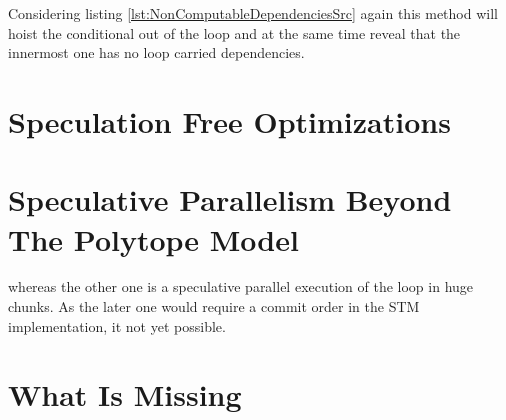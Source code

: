 Considering listing \ref{lst:NonComputableDependenciesSrc} again this method 
will hoist the conditional out of the loop and at the same time reveal that
the innermost one has no loop carried dependencies. 

\section{Speculation Free Optimizations}
\label{SpeculationFreesSCoPs}

\section{Speculative Parallelism Beyond The Polytope Model}
\label{SpeculativeParallelismBeyondThePolytopeModel}
whereas the other one is a speculative parallel execution of the loop in huge chunks.
As the later one would require a commit order in the STM implementation, it 
not yet possible. 


\section{What Is Missing}





